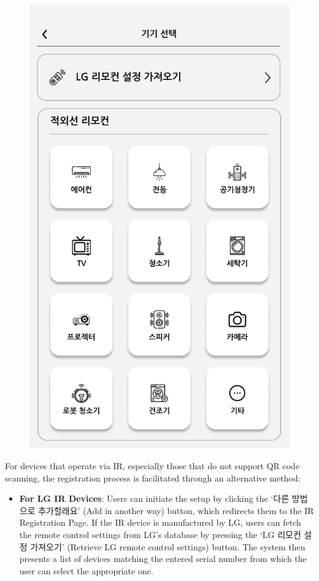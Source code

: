 \documentclass[conference]{IEEEtran}
\begin{document}
\begin{enumerate}[label=\arabic*.]
\begin{enumerate}[label=\alph*.]
\begin{figure}[H]\centering \includegraphics[scale=0.35]{images/sw-spec-13.png}\end{figure}
For devices that operate via IR, especially those that do not support QR code scanning, the registration process is facilitated through an alternative method:\\
\begin{itemize}
\item \textbf{For LG IR Devices}: Users can initiate the setup by clicking the ‘다른 방법으로 추가할래요’ (Add in another way) button, which redirects them to the IR Registration Page. If the IR device is manufactured by LG, users can fetch the remote control settings from LG's database by pressing the ‘LG 리모컨 설정 가져오기’ (Retrieve LG remote control settings) button. The system then presents a list of devices matching the entered serial number from which the user can select the appropriate one.\\

\end{itemize}
\end{enumerate}
\end{enumerate}
\end{document}
